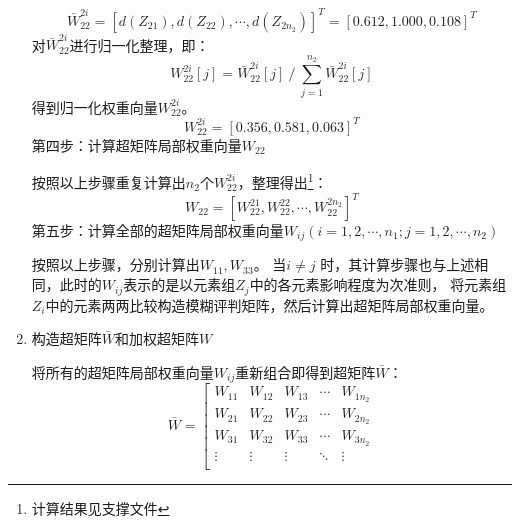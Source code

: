\documentclass[withoutpreface,bwprint]{cumcmthesis}
\begin{document}
\begin{enumerate}
\begin{equation}
                        \bar{W}_{22}^{2i}=\left[d\left(Z_{21}\right), d\left(Z_{22}\right), \cdots, d\left(Z_{2 n_2}\right)\right]^T = [0.612, 1.000, 0.108]^T
                      \end{equation}
                      \phantom{第三步：}对$\bar{W}_{22}^{2i}$进行归一化整理，即：
                      \begin{equation}
                          W_{22}^{2i}[j] = \bar{W}_{22}^{2i}[j] \ /\ \sum_{j = 1}^{n_2} \bar{W}_{22}^{2i}[j]
                      \end{equation}
                      \phantom{第三步：}得到归一化权重向量$W_{22}^{2i}$。
                      \begin{equation*}
                          W_{22}^{2i} = [0.356, 0.581, 0.063]^T
                      \end{equation*}
                      第四步：计算超矩阵局部权重向量$W_{22}$ \par
                      \phantom{第四步：}按照以上步骤重复计算出$n_2$个$W_{22}^{2i}$，整理得出\footnote{计算结果见支撑文件}：
                      \begin{equation*}
                        W_{22} = \left[ W_{22}^{21}, W_{22}^{22}, \cdots, W_{22}^{2n_2}\right]^T
                      \end{equation*}
                      第五步：计算全部的超矩阵局部权重向量$W_{ij}(i = 1, 2, \cdots, n_1 ; j = 1, 2, \cdots, n_2)$ \par
                      按照以上步骤，分别计算出$W_{11 }, W_{33}$。
                      当$i \neq j$ 时，其计算步骤也与上述相同，此时的$W_{ij}$表示的是以元素组$Z_j$中的各元素影响程度为次准则，
                      将元素组$Z_{i}$中的元素两两比较构造模糊评判矩阵，然后计算出超矩阵局部权重向量。
                \item 构造超矩阵$\bar{W}$和加权超矩阵$W$ \par
                      将所有的超矩阵局部权重向量$W_{ij}$重新组合即得到超矩阵$\bar{W}$：
                      \begin{equation}
                        \bar{W}=\left[\begin{array}{cccccc}
                        W_{11} & W_{12} & W_{13} & \cdots & W_{1 n_2} \\
                        W_{21} & W_{22} & W_{23} & \cdots & W_{2 n_2} \\
                        W_{31} & W_{32} & W_{33} & \cdots & W_{3 n_2} \\
                        \vdots & \vdots & \vdots & \ddots & \vdots \\

\end{array}
\end{equation}
\end{enumerate}
\end{document}
